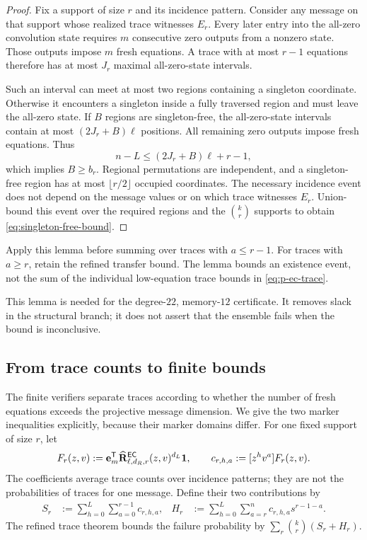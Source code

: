 \begin{proof}
Fix a support of size $r$ and its incidence pattern.  Consider any message
on that support whose realized trace witnesses $E_r$.
Every later entry into the all-zero convolution state requires $m$
consecutive zero outputs from a nonzero state.  Those outputs impose $m$
fresh equations.  A trace with at most $r-1$ equations therefore has at most
$J_r$ maximal all-zero-state intervals.

Such an interval can meet at most two regions containing a singleton
coordinate.  Otherwise it encounters a singleton inside a fully traversed
region and must leave the all-zero state.  If $B$ regions are singleton-free,
the all-zero-state intervals contain at most $(2J_r+B)\ell$ positions.  All
remaining zero outputs impose fresh equations.  Thus
\[
 n-L\leq(2J_r+B)\ell+r-1,
\]
which implies $B\geq b_r$.  Regional permutations are independent, and a
singleton-free region has at most $\lfloor r/2\rfloor$ occupied coordinates.
The necessary incidence event does not depend on the message values or on
which trace witnesses $E_r$.  Union-bound this event over the required
regions and the $\binom{k}{r}$ supports to obtain
\eqref{eq:singleton-free-bound}.
\end{proof}

Apply this lemma before summing over traces with $a\leq r-1$.
For traces with $a\geq r$, retain the refined transfer bound.
The lemma bounds an existence event, not the sum of the individual
low-equation trace bounds in \eqref{eq:p-ec-trace}.

This lemma is needed for the degree-$22$, memory-$12$ certificate.  It removes
slack in the structural branch; it does not assert that the ensemble fails
when the bound is inconclusive.

\subsection{From trace counts to finite bounds}

The finite verifiers separate traces according to whether the number of
fresh equations exceeds the projective message dimension.  We give the two
marker inequalities explicitly, because their marker domains differ.
For one fixed support of size $r$, let
\[
 F_r(z,v):=\mathbf e_m^{\mathsf T}
 \widehat{\mathbf R}^{\mathsf{EC}}_{\ell,d_R,r}(z,v)^{d_L}\mathbf 1,
 \qquad c_{r,h,a}:=[z^hv^a]F_r(z,v).
\]
The coefficients average trace counts over incidence patterns; they are not
the probabilities of traces for one message.
Define their two contributions by
\begin{align*}
 S_r&:=\sum_{h=0}^{L}\sum_{a=0}^{r-1}c_{r,h,a},&
 H_r&:=\sum_{h=0}^{L}\sum_{a=r}^{n}c_{r,h,a}s^{r-1-a}.
\end{align*}
The refined trace theorem bounds the failure probability by
$\sum_r\binom{k}{r}(S_r+H_r)$.

